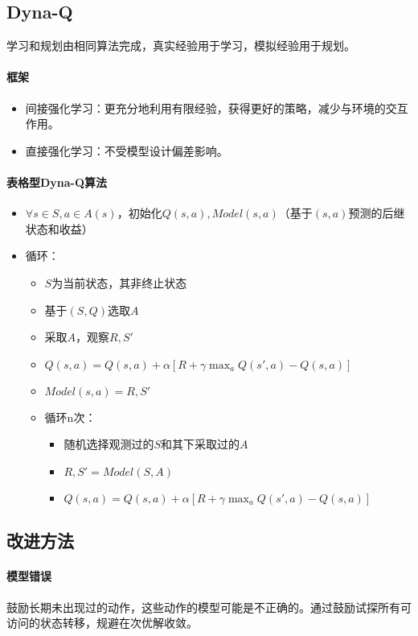 \documentclass[
12pt, %
a4paper, 
oneside, %
headinclude,footinclude, %
]{scrartcl}
\begin{document}
\subsection{Dyna-Q}
学习和规划由相同算法完成，真实经验用于学习，模拟经验用于规划。
\paragraph{框架}
\begin{itemize}
\item 间接强化学习：更充分地利用有限经验，获得更好的策略，减少与环境的交互作用。
\item 直接强化学习：不受模型设计偏差影响。
\end{itemize}
\paragraph{表格型Dyna-Q算法}
\begin{itemize}
\item $ \forall s \in S, a \in A(s) $，初始化$ Q(s, a),Model(s, a) $（基于$ (s, a) $预测的后继状态和收益）
\item 循环：
\begin{itemize}
\item $ S $为当前状态，其非终止状态
\item 基于$ (S,Q) $选取$ A $
\item 采取$ A $，观察$ R,S' $
\item $ Q(s, a) = Q(s, a) + \alpha[R + \gamma \max_aQ(s', a) - Q(s, a)] $
\item $ Model(s, a) = R,S' $
\item 循环n次：
\begin{itemize}
\item 随机选择观测过的$ S $和其下采取过的$ A $
\item $ R,S' = Model(S, A) $
\item $ Q(s, a) = Q(s, a) + \alpha[R + \gamma \max_aQ(s', a) - Q(s, a)] $
\end{itemize}
\end{itemize}
\end{itemize}
\subsection{改进方法}
\paragraph{模型错误}
鼓励长期未出现过的动作，这些动作的模型可能是不正确的。通过鼓励试探所有可访问的状态转移，规避在次优解收敛。
\end{document}
